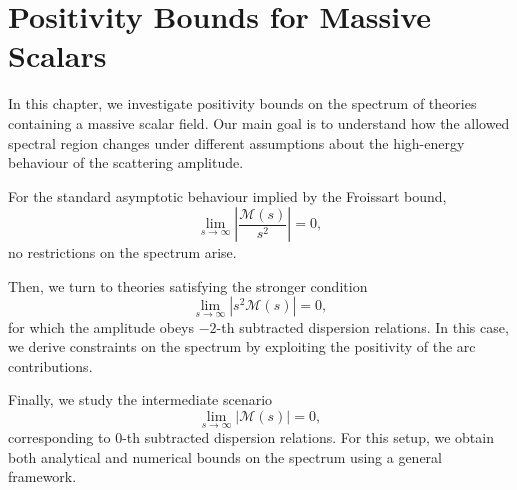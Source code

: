 \chapter{Positivity Bounds for Massive Scalars}
\label{chap:scalar}

In this chapter, we investigate positivity bounds on the spectrum of theories containing a massive scalar field. Our main goal is to understand how the allowed spectral region changes under different assumptions about the high-energy behaviour of the scattering amplitude.  

For the standard asymptotic behaviour implied by the Froissart bound,
\begin{equation*}
    \lim_{s \to \infty}\left|\frac{\mathcal{M}(s)}{s^{2}}\right|=0,
\end{equation*}
no restrictions on the spectrum arise.  

Then, we turn to theories satisfying the stronger condition
\begin{equation*}
    \lim_{s \to \infty}\left|s^{2}\mathcal{M}(s)\right|=0,
\end{equation*}
for which the amplitude obeys $-2$-th subtracted dispersion relations. In this case, we derive constraints on the spectrum by exploiting the positivity of the arc contributions.  

Finally, we study the intermediate scenario
\begin{equation*}
    \lim_{s \to \infty}\left|\mathcal{M}(s)\right|=0,
\end{equation*}
corresponding to $0$-th subtracted dispersion relations. For this setup, we obtain both analytical and numerical bounds on the spectrum using a general framework.

